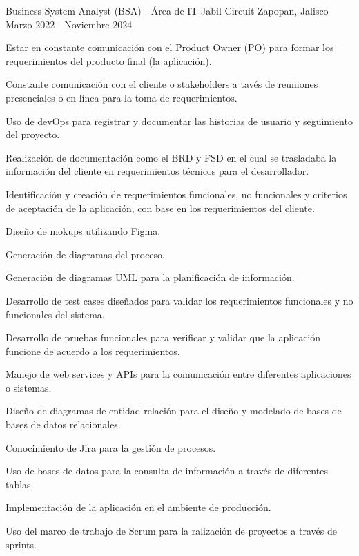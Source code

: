 \begin{cventries}
\cventry
{Business System Analyst (BSA) - Área de IT} %
{Jabil Circuit} %
{Zapopan, Jalisco} %
{Marzo 2022 - Noviembre 2024} %
{ %
\begin{cvitems}
\item {Estar en constante comunicación con el Product Owner (PO) para formar los requerimientos del producto final (la aplicación)}.
\item {Constante comunicación con el cliente o stakeholders a tavés de reuniones presenciales o en línea para la toma de requerimientos.}
\item {Uso de devOps para registrar y documentar las historias de usuario y seguimiento del proyecto.}
\item {Realización de documentación como el BRD y FSD en el cual se trasladaba la información del cliente en requerimientos técnicos para el desarrollador.}
\item {Identificación y creación de requerimientos funcionales, no funcionales y criterios de aceptación de la aplicación, con base en los requerimientos del cliente.}
\item {Diseño de mokups utilizando Figma.}
\item {Generación de diagramas del proceso.}
\item {Generación de diagramas UML para la planificación de información.}
\item {Desarrollo de test cases diseñados para validar los requerimientos funcionales y no funcionales del sistema.}
\item{Desarrollo de pruebas funcionales para verificar y validar que la aplicación funcione de acuerdo a los requerimientos.}
\item {Manejo de web services y APIs para la comunicación entre diferentes aplicaciones o sistemas.}
\item {Diseño de diagramas de entidad-relación para el diseño y modelado de bases de bases de datos relacionales.}
\item {Conocimiento de Jira para la gestión de procesos.}
\item {Uso de bases de datos para la consulta de información a través de diferentes tablas.}
\item {Implementación de la aplicación en el ambiente de producción.}
\item{Uso del marco de trabajo de Scrum para la ralización de proyectos a través de sprints.}
\end{cvitems} 
}




\end{cventries}